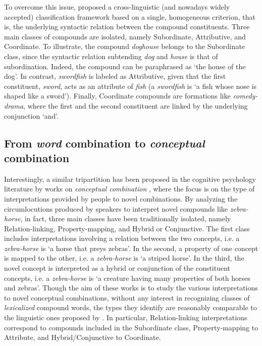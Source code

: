 \documentclass[output=paper]{langsci/langscibook}
\begin{document}
To overcome this issue, \cite{SB2005} proposed a cross-linguistic (and nowadays widely accepted) classification framework based on a single, homogeneous criterion, that is, the underlying syntactic relation between the compound constituents. Three main classes of compounds are isolated, namely Subordinate, Attributive, and Coordinate. To illustrate, the compound \emph{doghouse} belongs to the Subordinate class, since the syntactic relation subtending \emph{dog} and \emph{house} is that of subordination. Indeed, the compound can be paraphrased as `the house of the dog'. In contrast, \emph{swordfish} is labeled as Attributive, given that the first constituent, \emph{sword}, acts as an attribute of \emph{fish} (a \emph{swordfish} is `a fish whose nose is shaped like a sword'). Finally, Coordinate compounds are formations like \emph{comedy-drama}, where the first and the second constituent are linked by the underlying conjunction `and'.

\subsection{From \emph{word} combination to \emph{conceptual} combination}

Interestingly, a similar tripartition has been proposed in the cognitive psychology literature by works on \emph{conceptual combination} \citep{wisniewski1996,costello2000}, where the focus is on the type of interpretations provided by people to novel combinations. By analyzing the circumlocutions produced by speakers to interpret novel compounds like \emph{zebra-horse}, in fact, three main classes have been traditionally isolated, namely Relation-linking, Property-mapping, and Hybrid or Conjunctive. The first class includes interpretations involving a relation between the two concepts, i.e. a \emph{zebra-horse} is `a horse that preys zebras'. In the second, a property of one concept is mapped to the other, i.e. a \emph{zebra-horse} is `a striped horse'. In the third, the novel concept is interpreted as a hybrid or conjunction of the constituent concepts, i.e. a \emph{zebra-horse} is `a creature having many properties of both horses and zebras'. Though the aim of these works is to study the various interpretations to novel conceptual combinations, without any interest in recognizing classes of \emph{lexicalized} compound words, the types they identify are reasonably comparable to the linguistic ones proposed by \cite{SB2005}. In particular, Relation-linking interpretations correspond to compounds included in the Subordinate class, Property-mapping to Attribute, and Hybrid/Conjunctive to Coordinate.
\end{document}
